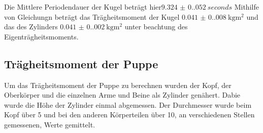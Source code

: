   
  Die Mittlere Periodendauer der Kugel beträgt hier$\qty{9.324(0.052)}{seconds}$
  Mithilfe von Gleichungn %
  beträgt das Trägheitsmoment der Kugel $\qty{0.041(0.008)}{\kilo\gram\meter\squared}$ und das des
  Zylinders $\qty{0.041(0.002)}{\kilo\gram\meter\squared}$ unter beachtung des Eigenträgheitsmoments.
  
  
  
  \subsection{Trägheitsmoment der Puppe}
  Um das Trägheitsmoment der Puppe zu berechnen wurden der Kopf, der Oberkörper und die einzelnen Arme und Beine als Zylinder genähert.
  Dabie wurde die Höhe der Zylinder einmal abgemessen. 
  Der Durchmesser wurde beim Kopf über 5 und bei den anderen Körperteilen über 10, an verschiedenen Stellen gemessenen, Werte gemittelt.
